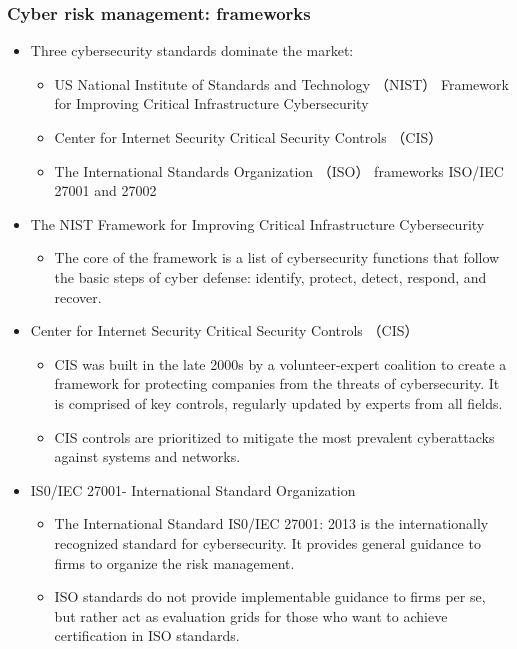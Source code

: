 \subsubsection{Cyber risk management: frameworks}
\begin{itemize}
\item Three cybersecurity standards dominate the market:
    \begin{itemize}
    \item US National Institute of Standards and Technology （NIST） Framework for Improving Critical Infrastructure Cybersecurity
    \item Center for Internet Security Critical Security Controls （CIS）
    \item The International Standards Organization （ISO） frameworks ISO/IEC 27001 and 27002
    \end{itemize}
\item The NIST Framework for Improving Critical Infrastructure Cybersecurity
    \begin{itemize}
    \item The core of the framework is a list of cybersecurity functions that follow the basic steps of cyber defense: identify, protect, detect, respond, and recover.
    \end{itemize}
\item Center for Internet Security Critical Security Controls （CIS）
    \begin{itemize}
    \item CIS was built in the late 2000s by a volunteer-expert coalition to create a framework for protecting companies from the threats of cybersecurity. It is comprised of key controls, regularly updated by experts from all fields.
    \item CIS controls are prioritized to mitigate the most prevalent cyberattacks against systems and networks.
    
    \end{itemize}
\item IS0/IEC 27001- International Standard Organization
    \begin{itemize}
    \item The International Standard IS0/IEC 27001: 2013 is the internationally recognized standard for cybersecurity. It provides general guidance to firms to organize the risk management.
    \item  ISO standards do not provide implementable guidance to firms per se, but rather act as evaluation grids for those who want to achieve certification in ISO standards.
    \end{itemize}
\end{itemize}




